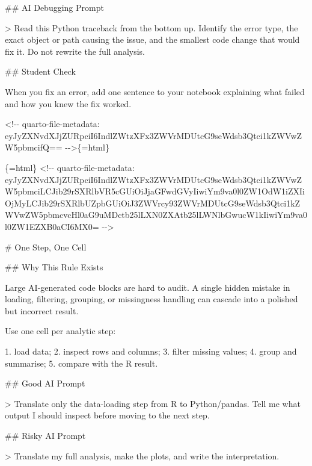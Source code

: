 \documentclass[
  letterpaper,
  DIV=11,
  numbers=noendperiod,
  oneside]{scrreprt}
\newenvironment{Shaded}{\begin{snugshade}}{\end{snugshade}}
\newcommand{\AttributeTok}[1]{\textcolor[rgb]{0.40,0.45,0.13}{#1}}
\newcommand{\FunctionTok}[1]{\textcolor[rgb]{0.28,0.35,0.67}{#1}}
\newcommand{\InformationTok}[1]{\textcolor[rgb]{0.37,0.37,0.37}{#1}}
\newcommand{\NormalTok}[1]{\textcolor[rgb]{0.00,0.23,0.31}{#1}}
\newcommand{\SpecialStringTok}[1]{\textcolor[rgb]{0.13,0.47,0.30}{#1}}
\begin{document}
\begin{Shaded}
\begin{Highlighting}[numbers=left,,]
\FunctionTok{\#\# AI Debugging Prompt}

\AttributeTok{\textgreater{} Read this Python traceback from the bottom up. Identify the error type, the exact object or path causing the issue, and the smallest code change that would fix it. Do not rewrite the full analysis.}

\FunctionTok{\#\# Student Check}

\NormalTok{When you fix an error, add one sentence to your notebook explaining what failed and how you knew the fix worked.}


\InformationTok{\textasciigrave{}\textless{}!{-}{-} quarto{-}file{-}metadata: eyJyZXNvdXJjZURpciI6IndlZWtzXFx3ZWVrMDUtcG9seWdsb3Qtci1kZWVwZW5pbmcifQ== {-}{-}\textgreater{}\textasciigrave{}}\NormalTok{\{=html\}}

\InformationTok{\textasciigrave{}\textasciigrave{}\textasciigrave{}\{=html\}}
\InformationTok{\textless{}!{-}{-} quarto{-}file{-}metadata: eyJyZXNvdXJjZURpciI6IndlZWtzXFx3ZWVrMDUtcG9seWdsb3Qtci1kZWVwZW5pbmciLCJib29rSXRlbVR5cGUiOiJjaGFwdGVyIiwiYm9va0l0ZW1OdW1iZXIiOjMyLCJib29rSXRlbUZpbGUiOiJ3ZWVrcy93ZWVrMDUtcG9seWdsb3Qtci1kZWVwZW5pbmcvcHl0aG9uMDctb25lLXN0ZXAtb25lLWNlbGwucW1kIiwiYm9va0l0ZW1EZXB0aCI6MX0= {-}{-}\textgreater{}}
\InformationTok{\textasciigrave{}\textasciigrave{}\textasciigrave{}}

\FunctionTok{\# One Step, One Cell }


\FunctionTok{\#\# Why This Rule Exists}

\NormalTok{Large AI{-}generated code blocks are hard to audit. A single hidden mistake in loading, filtering, grouping, or missingness handling can cascade into a polished but incorrect result.}

\NormalTok{Use one cell per analytic step:}

\SpecialStringTok{1. }\NormalTok{load data;}
\SpecialStringTok{2. }\NormalTok{inspect rows and columns;}
\SpecialStringTok{3. }\NormalTok{filter missing values;}
\SpecialStringTok{4. }\NormalTok{group and summarise;}
\SpecialStringTok{5. }\NormalTok{compare with the R result.}

\FunctionTok{\#\# Good AI Prompt}

\AttributeTok{\textgreater{} Translate only the data{-}loading step from R to Python/pandas. Tell me what output I should inspect before moving to the next step.}

\FunctionTok{\#\# Risky AI Prompt}

\AttributeTok{\textgreater{} Translate my full analysis, make the plots, and write the interpretation.}


\end{Highlighting}
\end{Shaded}
\end{document}
